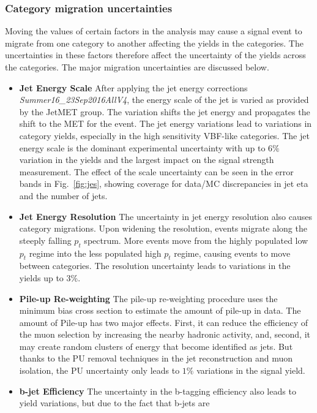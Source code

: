 \subsubsection{Category migration uncertainties}
Moving the values of certain factors in the analysis may cause a signal event to migrate from one category to another affecting the yields in the categories. The uncertainties in these factors therefore affect the uncertainty of the yields across the categories. The major migration uncertainties are discussed below.  

\begin{itemize}
    \item {\bf Jet Energy Scale} After applying the jet energy corrections {\it Summer16\_23Sep2016AllV4}, the energy scale of
    the jet is varied as provided by the JetMET group. The variation shifts the jet energy and propagates the shift to the MET for the event. 
    The jet energy variations lead to variations in category yields, especially in the high sensitivity VBF-like categories.
    The jet energy scale is the dominant experimental uncertainty with up to $6\%$ variation in the yields and the largest impact on the signal strength measurement.
    The effect of the scale uncertainty can be seen in the error bands in Fig.~\ref{fig:jes}, 
    showing coverage for data/MC discrepancies in jet eta and the number of jets.
    \item {\bf Jet Energy Resolution} The uncertainty in jet energy resolution also causes category migrations. 
    Upon widening the resolution, events migrate along the steeply falling $p_t$ spectrum. 
    More events move from the highly populated low $p_t$ regime into the less populated high $p_t$ regime, causing events to move between categories. 
    The resolution uncertainty leads to variations in the yields up to 3\%.
    \item {\bf Pile-up Re-weighting} The pile-up re-weighting procedure uses the minimum bias cross section to 
    estimate the amount of pile-up in data. The amount of Pile-up has two major effects. First, it can reduce the efficiency of
    the muon selection by increasing the nearby hadronic activity, and, second, it may create random clusters of energy that become identified as jets.
    But thanks to the PU removal techniques in the jet reconstruction and muon isolation, the PU uncertainty only leads to $1\%$ variations in the signal yield.
    \item {\bf b-jet Efficiency} The uncertainty in the b-tagging efficiency also leads to yield variations, but due to the fact that b-jets are 

\end{itemize}
